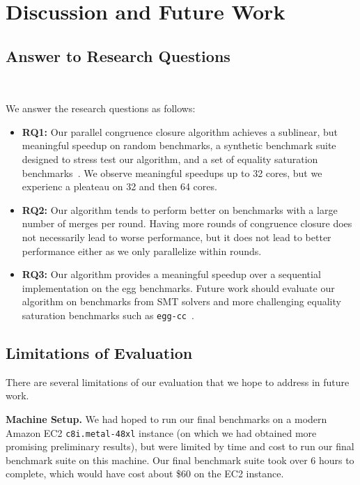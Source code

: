 \section{Discussion and Future Work}
\label{sec:disc}

\subsection{Answer to Research Questions}~\label{sec:disc:rq}

We answer the research questions as follows:

\begin{itemize}
  \item \textbf{RQ1:} Our parallel congruence closure algorithm achieves a sublinear,
  but meaningful speedup on random benchmarks, a synthetic benchmark suite
  designed to stress test our algorithm, and a set of equality saturation
  benchmarks~\cite{eqsat}. We observe meaningful speedups up to 32 cores, but we experienc
  a pleateau on 32 and then 64 cores.
  \item \textbf{RQ2:} Our algorithm tends to perform better on benchmarks with a large
  number of merges per round. Having more rounds of congruence closure does not necessarily
  lead to worse performance, but it does not lead to better performance either as we only 
  parallelize within rounds.
  \item \textbf{RQ3:} Our algorithm provides a meaningful speedup over a
  sequential implementation on the egg benchmarks. Future work should evaluate
  our algorithm on benchmarks from SMT solvers and  more challenging equality
  saturation benchmarks such as \texttt{egg-cc}~\cite{eggcc}.
\end{itemize}


\subsection{Limitations of Evaluation}

There are several limitations of our evaluation that we hope to address in future work.

\textbf{Machine Setup.} We had hoped to run our final benchmarks on a modern Amazon EC2 \texttt{c8i.metal-48xl} instance (on which we had obtained more promising preliminary results), but were limited by time and cost to run our final benchmark suite on this machine. Our final benchmark suite took over 6 hours to complete, which would have cost about \$60 on the EC2 instance.

